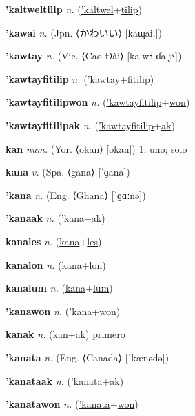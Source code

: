 \textbf{\hypertarget{'kaltweltilip}{'kaltweltilip}} \textit{n.} (\hyperlink{'kaltwel}{'kaltwel}+\allowbreak \hyperlink{tilip}{tilip})


\textbf{\hypertarget{'kawai}{'kawai}} \textit{n.} (Jpn. ⟨{\japanese{}かわいい}⟩ [kaɰaiː])


\textbf{\hypertarget{'kawtay}{'kawtay}} \textit{n.} (Vie. ⟨Cao Đài⟩ [kaːw˧ ɗaːj˦˨])


\textbf{\hypertarget{'kawtayfitilip}{'kawtayfitilip}} \textit{n.} (\hyperlink{'kawtay}{'kawtay}+\allowbreak \hyperlink{fitilip}{fitilip})


\textbf{\hypertarget{'kawtayfitilipwon}{'kawtayfitilipwon}} \textit{n.} (\hyperlink{'kawtayfitilip}{'kawtayfitilip}+\allowbreak \hyperlink{won}{won})


\textbf{\hypertarget{'kawtayfitilipak}{'kawtayfitilipak}} \textit{n.} (\hyperlink{'kawtayfitilip}{'kawtayfitilip}+\allowbreak \hyperlink{ak}{ak})


\textbf{\hypertarget{kan}{kan}} \textit{num.} (Yor. ⟨okan⟩ [okan])
1; uno; solo

\textbf{\hypertarget{kana}{kana}} \textit{v.} (Spa. ⟨gana⟩ [ˈɡana])


\textbf{\hypertarget{'kana}{'kana}} \textit{n.} (Eng. ⟨Ghana⟩ [ˈɡɑːnə])


\textbf{\hypertarget{'kanaak}{'kanaak}} \textit{n.} (\hyperlink{'kana}{'kana}+\allowbreak \hyperlink{ak}{ak})


\textbf{\hypertarget{kanales}{kanales}} \textit{n.} (\hyperlink{kana}{kana}+\allowbreak \hyperlink{les}{les})


\textbf{\hypertarget{kanalon}{kanalon}} \textit{n.} (\hyperlink{kana}{kana}+\allowbreak \hyperlink{lon}{lon})


\textbf{\hypertarget{kanalum}{kanalum}} \textit{n.} (\hyperlink{kana}{kana}+\allowbreak \hyperlink{lum}{lum})


\textbf{\hypertarget{'kanawon}{'kanawon}} \textit{n.} (\hyperlink{'kana}{'kana}+\allowbreak \hyperlink{won}{won})


\textbf{\hypertarget{kanak}{kanak}} \textit{n.} (\hyperlink{kan}{kan}+\allowbreak \hyperlink{ak}{ak})
primero

\textbf{\hypertarget{'kanata}{'kanata}} \textit{n.} (Eng. ⟨Canada⟩ [ˈkænədə])


\textbf{\hypertarget{'kanataak}{'kanataak}} \textit{n.} (\hyperlink{'kanata}{'kanata}+\allowbreak \hyperlink{ak}{ak})


\textbf{\hypertarget{'kanatawon}{'kanatawon}} \textit{n.} (\hyperlink{'kanata}{'kanata}+\allowbreak \hyperlink{won}{won})


